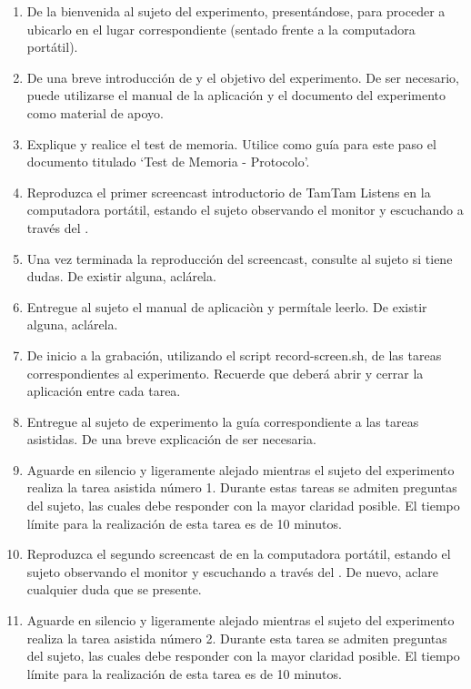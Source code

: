 \begin{enumerate}
    \item De la bienvenida al sujeto del experimento, present\'andose, para proceder a ubicarlo en el lugar correspondiente (sentado frente a la computadora port\'atil).
    \item De una breve introducci\'on de  y el objetivo del experimento. 
    De ser necesario, puede utilizarse el manual de la aplicaci\'on y el documento del experimento como 
    material de apoyo.
    \item Explique y realice el test de memoria. Utilice como gu\'ia para este paso el documento titulado 
    ‘Test de Memoria - Protocolo’.
    \item Reproduzca el primer screencast introductorio de TamTam Listens en la computadora port\'atil, 
    estando el sujeto observando el monitor y escuchando a trav\'es del .
    \item Una vez terminada la reproducci\'on del screencast, consulte al sujeto si tiene dudas. De 
    existir alguna, acl\'arela.
    \item Entregue al sujeto el manual de aplicaciòn y perm\'itale leerlo. De existir alguna, acl\'arela.
    \item De inicio a la grabaci\'on, utilizando el script record-screen.sh, de las tareas
    correspondientes al experimento. Recuerde que deber\'a abrir y cerrar la aplicaci\'on entre 
    cada tarea.
    \item Entregue al sujeto de experimento la gu\'ia correspondiente a las tareas asistidas. De una 
    breve explicaci\'on de ser necesaria.
    \item Aguarde en silencio y ligeramente alejado mientras el sujeto del experimento realiza la tarea 
    asistida n\'umero 1. Durante estas tareas se admiten preguntas del sujeto, las cuales debe responder 
    con la mayor claridad posible. El tiempo l\'imite para la realizaci\'on de esta tarea es de 
    10 minutos.
    \item Reproduzca el segundo screencast de  en la computadora port\'atil,
    estando el sujeto observando el monitor y escuchando a trav\'es del . De nuevo, aclare 
    cualquier duda que se presente.
    \item Aguarde en silencio y ligeramente alejado mientras el sujeto del experimento realiza la tarea asistida n\'umero 2. Durante esta tarea se admiten preguntas del sujeto, las cuales debe responder con la mayor claridad posible. El tiempo l\'imite para la realizaci\'on de esta tarea es de 10 minutos.

\end{enumerate}
